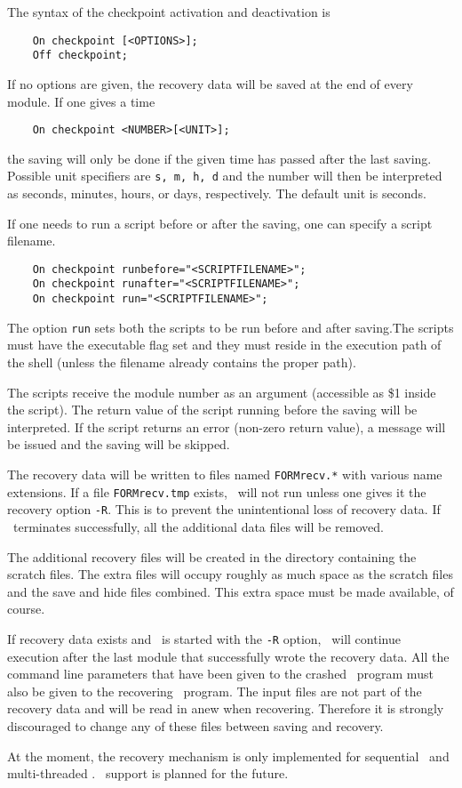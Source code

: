 The syntax of the checkpoint activation and deactivation is
\begin{verbatim}
    On checkpoint [<OPTIONS>];
    Off checkpoint;
\end{verbatim}

If no options are given, the recovery data will be saved at the end of every
module. If one gives a time
\begin{verbatim}
    On checkpoint <NUMBER>[<UNIT>];
\end{verbatim}
the saving will only be done if the given time has passed after the last 
saving. Possible unit specifiers are {\tt s, m, h, d} and the number will 
then be interpreted as seconds, minutes, hours, or days, respectively. The 
default unit is seconds.

If one needs to run a script before or after the saving,
one can specify a script filename.
\begin{verbatim}
    On checkpoint runbefore="<SCRIPTFILENAME>";
    On checkpoint runafter="<SCRIPTFILENAME>";
    On checkpoint run="<SCRIPTFILENAME>";
\end{verbatim}
The option {\tt run} sets both the scripts to be run before and 
after saving.The scripts must have the executable flag set and they must 
reside in the execution path of the shell (unless the filename 
already contains the proper path).

The scripts receive the module number as an argument 
(accessible as \$1 inside the script). The return value of the script 
running before the saving will be interpreted. If the script returns an 
error (non-zero return value), a message will be issued and the saving will 
be skipped. 

The recovery data will be written to files named {\tt FORMrecv.*} with 
various name extensions. If a file {\tt FORMrecv.tmp} exists, \FORM\ will not 
run unless one gives it the recovery option
{\tt -R}. This is to prevent the unintentional loss of recovery data. If 
\FORM\ terminates successfully, all the additional data files will be removed.

The additional recovery files will be created in the directory containing 
the scratch files.  The extra files will occupy roughly as much space as 
the scratch files and the save and 
hide files combined. This extra space must be made 
available, of course.

If recovery data exists and \FORM\ is started with the {\tt -R} option, \FORM\ 
will continue execution after the last module that successfully wrote the 
recovery data. All the command line parameters that have been given to the 
crashed \FORM\ program\index{crashed \FORM\ program} must also be given to the 
recovering \FORM\ program. The input files are not part of the recovery data 
and will be read in anew when recovering. Therefore it is strongly 
discouraged to change any of these files between saving and recovery.

At the moment, the recovery mechanism is only implemented for sequential \FORM\
and multi-threaded \TFORM.  \ParFORM\ support is planned for the future.

